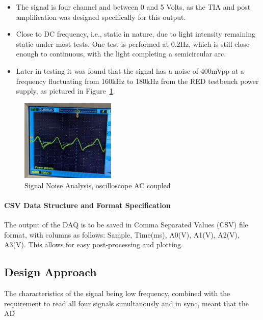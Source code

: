 \begin{itemize}
    \item The signal is four channel and between 0 and 5 Volts, as the TIA and post amplification was designed specifically for this output.
    \item Close to DC frequency, i.e., static in nature, due to light intensity remaining static under most tests. One test is performed at 0.2Hz, which is still close enough to continuous, with the light completing a semicircular arc. 
    \item Later in testing it was found that the signal has a noise of 400mVpp at a frequency fluctuating from 160kHz to 180kHz from the RED testbench power supply, as pictured in Figure~\ref{fig:sigNoise}.
\end{itemize}
\begin{figure}[htbp] 
    \centering
    \includegraphics[width=0.4\textwidth]{chapters/methodology/ArduinoDAQ/signal_noise.png}
    \caption{Signal Noise Analysis, oscilloscope AC coupled}
    \label{fig:sigNoise}
\end{figure}

\paragraph{CSV Data Structure and Format Specification}
The output of the DAQ is to be saved in Comma Separated Values (CSV) file format, with columns as follows: Sample, Time(ms), A0(V), A1(V), A2(V), A3(V). This allows for easy post-processing and plotting.
\subsection{Design Approach}
The characteristics of the signal being low frequency, combined with the requirement to read all four signals simultanously and in sync, meant that the AD

